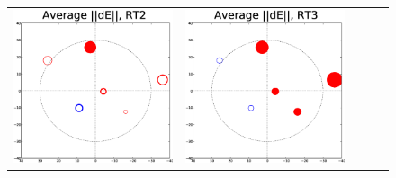 \documentclass[]{aa}
\begin{document}
\begin{figure}
\begin{tabular}{@{}c@{}c@{}c@{}c@{}c@{}}
\includegraphics[width=\roguewidth]{o2003_dE_ant2} &
\includegraphics[width=\roguewidth]{o2003_dE_ant3} &

\end{tabular}
\end{figure}
\end{document}
